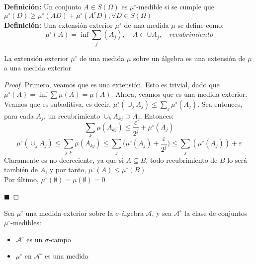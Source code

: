 \documentclass[12pt,a4paper]{book}
\newcommand*{\qed}{\hfill\ensuremath{\blacksquare}}
\begin{document}
\textbf{Definición:} Un conjunto $A\in S(\Omega)$ es $\mu^\circ$-medible si se cumple que $\mu^\circ(D) \geq \mu^\circ(AD)+\mu^\circ(A^cD), \forall D \in S(\Omega)$\\

\textbf{Definición:} Una extensión exterior $\mu^\circ$ de una medida $\mu$ se define como:
$$\mu^\circ (A) = \inf \sum_j (A_j), \quad A \subset \cup A_j,\quad recubrimiento $$

\begin{theorem}
La extensión exterior $\mu^\circ$ de una medida $\mu$ sobre un álgebra es una extensión de $\mu$ a una medida exterior
\end{theorem}

\begin{proof}
Primero, veamos que es una extensión. Esto es trivial, dado que $\mu^\circ(A) = \inf \displaystyle \sum \mu(A) = \mu(A)$. Ahora, veamos que es una medida exterior.\\

Veamos que es subaditiva, es decir, $\mu^\circ(\displaystyle \cup_j A_j) \leq \sum_j \mu^\circ(A_j)$. Sea entonces, para cada $A_j$, un recubrimiento $ \displaystyle \cup_k A_{kj} \supset A_j$. Entonces:
$$ \sum_k \mu (A_{kj}) \leq \frac{\varepsilon}{2^j} + \mu^\circ (A_j)$$
$$ \mu^\circ (\cup_j A_j) \leq \sum_{j,k} \mu (A_{kj}) \leq \sum_j \Big( \mu^\circ(A_j) + \frac{\varepsilon}{2^j}\Big) \leq \sum_j (\mu^\circ(A_j)) + \varepsilon $$
Claramente es no decreciente, ya que si $A \subseteq B$, todo recubrimiento de $B$ lo será también de $A$, y por tanto, $\mu^\circ(A) \leq \mu^\circ(B)$\\

Por último, $\mu^\circ(\emptyset) = \mu(\emptyset) = 0$

\qed
\end{proof}

\begin{theorem}
Sea $\mu^\circ$ una medida exterior sobre la $\sigma$-álgebra $\mathcal{A}$, y sea $\mathcal{A}^\circ$ la clase de conjuntos $\mu^\circ$-medibles:
\begin{itemize}
\item $\mathcal{A}^\circ$ es un $\sigma$-campo
\item $\mu^\circ$ en $\mathcal{A}^\circ$ es una medida
\end{itemize}
\end{theorem}
\end{document}
